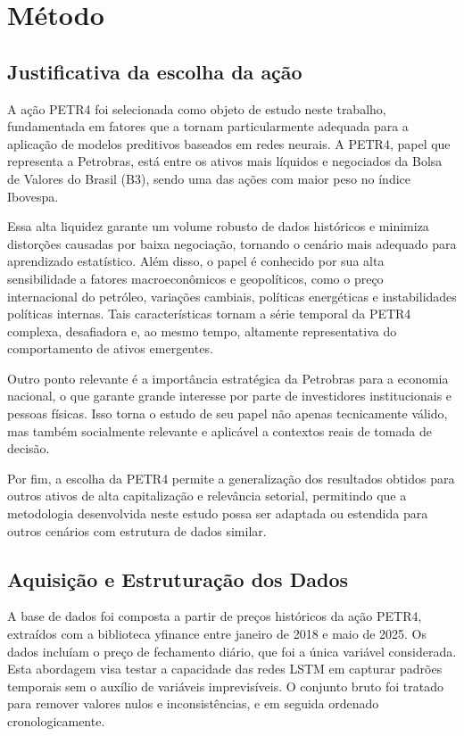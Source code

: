 \documentclass[conference]{IEEEtran}
\begin{document}
\section{Método}

\subsection{Justificativa da escolha da ação}
A ação PETR4 foi selecionada como objeto de estudo neste trabalho, fundamentada em fatores que a tornam particularmente adequada para a aplicação de modelos preditivos baseados em redes neurais. A PETR4, papel que representa a Petrobras, está entre os ativos mais líquidos e negociados da Bolsa de Valores do Brasil (B3), sendo uma das ações com maior peso no índice Ibovespa.

Essa alta liquidez garante um volume robusto de dados históricos e minimiza distorções causadas por baixa negociação, tornando o cenário mais adequado para aprendizado estatístico. Além disso, o papel é conhecido por sua alta sensibilidade a fatores macroeconômicos e geopolíticos, como o preço internacional do petróleo, variações cambiais, políticas energéticas e instabilidades políticas internas. Tais características tornam a série temporal da PETR4 complexa, desafiadora e, ao mesmo tempo, altamente representativa do comportamento de ativos emergentes.

Outro ponto relevante é a importância estratégica da Petrobras para a economia nacional, o que garante grande interesse por parte de investidores institucionais e pessoas físicas. Isso torna o estudo de seu papel não apenas tecnicamente válido, mas também socialmente relevante e aplicável a contextos reais de tomada de decisão.

Por fim, a escolha da PETR4 permite a generalização dos resultados obtidos para outros ativos de alta capitalização e relevância setorial, permitindo que a metodologia desenvolvida neste estudo possa ser adaptada ou estendida para outros cenários com estrutura de dados similar.

\subsection{Aquisição e Estruturação dos Dados}
A base de dados foi composta a partir de preços históricos da ação PETR4, extraídos com a biblioteca yfinance entre janeiro de 2018 e maio de 2025. Os dados incluíam o preço de fechamento diário, que foi a única variável considerada. Esta abordagem visa testar a capacidade das redes LSTM em capturar padrões temporais sem o auxílio de variáveis imprevisíveis. O conjunto bruto foi tratado para remover valores nulos e inconsistências, e em seguida ordenado cronologicamente.
\end{document}
